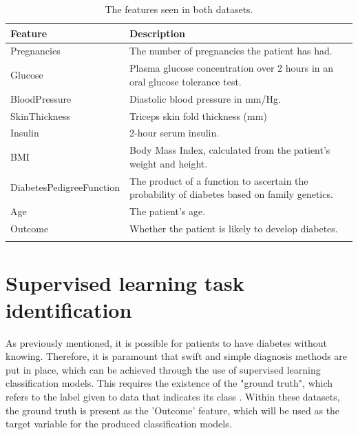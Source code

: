 \documentclass[12pt]{report}
\begin{document}
\begin{longtable}{ | p{} | p{} | }
    \hline
    \cellcolor{blue!25}Feature & \cellcolor{blue!25}Description \\
    \hline
    Pregnancies & The number of pregnancies the patient has had. \\
    \hline
    Glucose & Plasma glucose concentration over 2 hours in an oral glucose tolerance test. \\
    \hline
    BloodPressure & Diastolic blood pressure in mm/Hg. \\
    \hline
    SkinThickness & Triceps skin fold thickness (mm) \\
    \hline
    Insulin & 2-hour serum insulin. \\
    \hline
    BMI & Body Mass Index, calculated from the patient's weight and height. \\
    \hline
    DiabetesPedigreeFunction & The product of a function to ascertain the probability of diabetes based on family genetics. \autocite{akmese_diagnosing_2022} \\
    \hline
    Age & The patient's age.\\
    \hline
    Outcome & Whether the patient is likely to develop diabetes.\\
    \hline 
    \caption{The features seen in both datasets.}\label{tab:Features}
\end{longtable}


\section{Supervised learning task identification}
As previously mentioned, it is possible for patients to have diabetes without knowing. Therefore,
it is paramount that swift and simple diagnosis methods are put in place, which can be achieved 
through the use of supervised learning classification models. This requires the existence of the 
"ground truth", which refers to the label given to data that indicates its class \autocite{c3ai_what_nodate}. 
Within these datasets, the ground truth is present as the 'Outcome' feature, which will be used 
as the target variable for the produced classification models.
\end{document}
